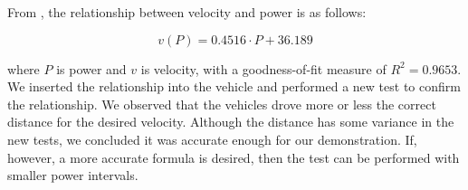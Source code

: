From , the relationship between velocity and power is as follows: 

\begin{equation}
	v(P) = 0.4516\cdot P + 36.189\label{eq:vprelationship}
\end{equation}

where $P$ is power and $v$ is velocity, with a goodness-of-fit measure of $R^2=0.9653$. We inserted the relationship into the vehicle and performed a new test to confirm the relationship. We observed that the vehicles drove more or less the correct distance for the desired velocity. Although the distance has some variance in the new tests, we concluded it was accurate enough for our demonstration. If, however, a more accurate formula is desired, then the test can be performed with smaller power intervals.

